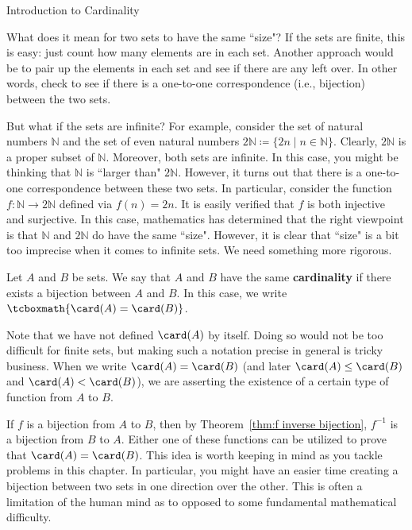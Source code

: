 \begin{section}{Introduction to Cardinality}\label{sec:Intro_to_Cardinality}

What does it mean for two sets to have the same ``size"?  If the sets are finite, this is easy: just count how many elements are in each set.  Another approach would be to pair up the elements in each set and see if there are any left over.  In other words, check to see if there is a one-to-one correspondence (i.e., bijection) between the two sets.  

But what if the sets are infinite?  For example, consider the set of natural numbers $\mathbb{N}$ and the set of even natural numbers $2\mathbb{N}\coloneqq \{2n\mid n\in \mathbb{N}\}$. Clearly, $2\mathbb{N}$ is a proper subset of $\mathbb{N}$.  Moreover, both sets are infinite.  In this case, you might be thinking that $\mathbb{N}$ is ``larger than" $2\mathbb{N}$.  However, it turns out that there is a one-to-one correspondence between these two sets.  In particular, consider the function $f:\mathbb{N}\to 2\mathbb{N}$ defined via $f(n)=2n$.  It is easily verified that $f$ is both injective and surjective.  In this case, mathematics has determined that the right viewpoint is that $\mathbb{N}$ and $2\mathbb{N}$ do have the same ``size". However, it is clear that ``size" is a bit too imprecise when it comes to infinite sets. We need something more rigorous.

\begin{definition}
Let $A$ and $B$ be sets. We say that $A$ and $B$ have the same \textbf{cardinality} if there exists a bijection between $A$ and $B$. In this case, we write $\tcboxmath{\card(A)=\card(B)}$.
\end{definition}

Note that we have not defined $\card(A)$ by itself. Doing so would not be too difficult for finite sets, but making such a notation precise in general is tricky business.  When we write $\card(A)=\card(B)$ (and later $\card(A)\leq \card(B)$ and $\card(A)<\card(B)$), we are asserting the existence of a certain type of function from $A$ to $B$.

If $f$ is a bijection from $A$ to $B$, then by Theorem~\ref{thm:f inverse bijection}, $f^{-1}$ is a bijection from $B$ to $A$.  Either one of these functions can be utilized to prove that $\card(A)=\card(B)$.  This idea is worth keeping in mind as you tackle problems in this chapter.  In particular, you might have an easier time creating a bijection between two sets in one direction over the other. This is often a limitation of the human mind as to opposed to some fundamental mathematical difficulty.


\end{section}

